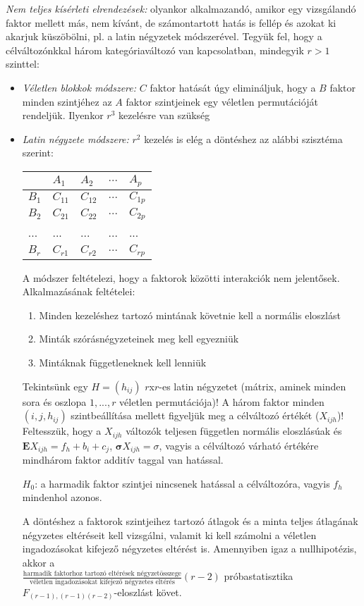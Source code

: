 \emph{Nem teljes kísérleti elrendezések:} olyankor alkalmazandó, amikor egy vizsgálandó faktor mellett más, nem kívánt, de számontartott hatás is fellép és azokat ki akarjuk küszöbölni, pl. a latin négyzetek módszerével. Tegyük fel, hogy a célváltozónkkal három kategóriaváltozó van kapcsolatban, mindegyik $r>1$ szinttel:
\begin{itemize}
\item \emph{Véletlen blokkok módszere:} $C$ faktor hatását úgy elimináljuk, hogy a $B$ faktor minden szintjéhez az $A$ faktor szintjeinek egy véletlen permutációját rendeljük. Ilyenkor $r^3$ kezelésre van szükség
\item \emph{Latin négyzete módszere:} $r^2$ kezelés is elég a döntéshez az alábbi szisztéma szerint:

\begin{table}[h]
\centering
\begin{tabular}{|l|l|l|l|l|}
\hline
 & $A_1$ & $A_2$ & $...$ & $A_p$
\\ \hline
$B_1$ & $C_{11}$ & $C_{12}$ & $...$ & $C_{1p}$
\\ \hline
$B_2$ & $C_{21}$ & $C_{22}$ & $...$ & $C_{2p}$
\\ \hline
... & ...& ...&...& ...
\\ \hline
$B_r$ & $C_{r1}$ & $C_{r2}$ & $...$ & $C_{rp}$
\\ \hline
\end{tabular}
\end{table}

A módszer feltételezi, hogy a faktorok közötti interakciók nem jelentősek. Alkalmazásának feltételei:
\begin{enumerate}
\item Minden kezeléshez tartozó mintának követnie kell a normális eloszlást
\item Minták szórásnégyzeteinek meg kell egyezniük
\item Mintáknak függetleneknek kell lenniük
\end{enumerate}

Tekintsünk egy $H=(h_{ij})$ $r$x$r$-es latin négyzetet (mátrix, aminek minden sora és oszlopa $1,...,r$ véletlen permutációja)! A három faktor minden $(i, j, h_{ij})$ szintbeállítása mellett figyeljük meg a célváltozó értékét ($X_{ijh}$)! Feltesszük, hogy a $X_{ijh}$ változók teljesen független normális eloszlásúak és $\mathbf{E}X_{ijh}=f_h+b_i+c_j$, $\mathbf{\sigma}X_{ijh}=\sigma$, vagyis a célváltozó várható értékére mindhárom faktor additív taggal van hatással.

$H_0$: a harmadik faktor szintjei nincsenek hatással a célváltozóra, vagyis $f_h$ mindenhol azonos.

A döntéshez a faktorok szintjeihez tartozó átlagok és a minta teljes átlagának négyzetes eltéréseit kell vizsgálni, valamit ki kell számolni a véletlen ingadozásokat kifejező négyzetes eltérést is. Amennyiben igaz a nullhipotézis, akkor a \\$\frac{\text{harmadik faktorhoz tartozó eltérések négyzetösszege}}{\text{véletlen ingadozásokat kifejező négyzetes eltérés}}(r-2)$ próbastatisztika \\$F_{(r-1),(r-1)(r-2)}$-eloszlást követ.

\end{itemize}

